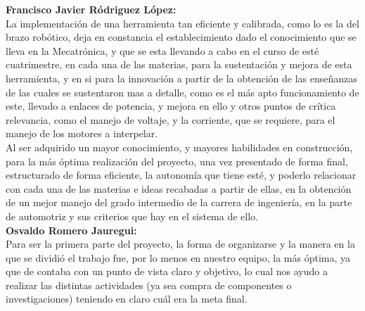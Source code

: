 \documentclass[14pt,a4paper]{article}
\begin{document}
\textbf{Francisco Javier Ródriguez López:}\\
La implementación de una herramienta tan eficiente y calibrada, como lo es la del brazo robótico, deja en constancia el establecimiento dado el conocimiento que se lleva en la Mecatrónica, y que se esta llevando a cabo en el curso de esté cuatrimestre, en cada una de las materias, para la sustentación y mejora de esta herramienta, y en si para la innovación a partir de la obtención de las enseñanzas de las cuales se sustentaron mas a detalle, como es el más apto funcionamiento de este, llevado a enlaces de potencia, y mejora en ello y otros puntos de crítica relevancia, como el manejo de voltaje, y la corriente, que se requiere, para el manejo de los motores a interpelar.\\
Al ser adquirido un mayor conocimiento, y mayores habilidades en construcción, para la más óptima realización del proyecto, una vez presentado de forma final, estructurado de forma eficiente, la autonomía que tiene esté, y poderlo relacionar con cada una de las materias e ideas recabadas a partir de ellas, en la obtención de un mejor manejo del grado intermedio de la carrera de ingeniería, en la parte de automotriz y sus criterios que hay en el sistema de ello.\\

\textbf{Osvaldo Romero Jauregui:}\\
Para ser la primera parte del proyecto, la forma de organizarse y la manera en la que se dividió el trabajo fue, por lo menos en nuestro equipo, la más óptima, ya que de contaba con un punto de vista claro y objetivo, lo cual nos ayudo a realizar las distintas actividades (ya sea compra de componentes o investigaciones) teniendo en claro cuál era la meta final.

\newpage



\end{document}
